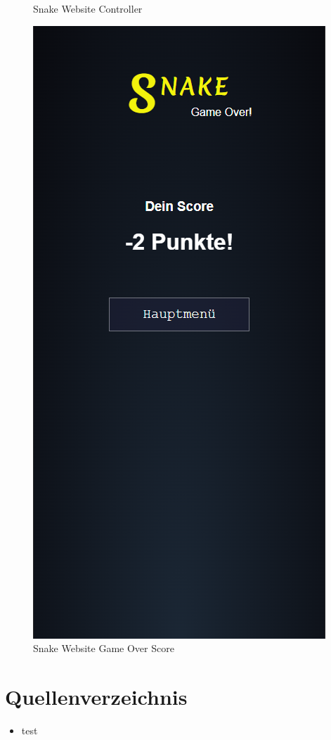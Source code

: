 \documentclass[a4paper,12pt]{scrartcl}
\begin{document}
\begin{figure}[!h]
\begin{minipage}[t]{.4\linewidth}
      \caption{Snake Website Controller}
      \label{fig:controller}
   \end{minipage}
   \hspace{.1\linewidth}%
   \begin{minipage}[t]{.4\linewidth}
      \includegraphics[width=\linewidth]{Abbildungen/Snake_Gameover.png}
      \caption{Snake Website Game Over Score}
      \label{fig:gameover}
   \end{minipage}
\end{figure}

\newpage

\section{Quellenverzeichnis}
\begin{itemize}
\item test
\end{itemize}
\end{document}
